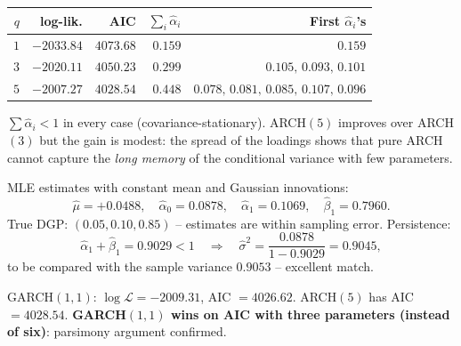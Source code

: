 \documentclass[a4paper,11pt]{article}
\begin{document}
\begin{solution}
\begin{center}
\begin{tabular}{rrrrr}
\toprule
$q$ & log-lik. & AIC      & $\sum_i \widehat\alpha_i$ & First $\widehat\alpha_i$'s \\
\midrule
$1$ & $-2033.84$ & $4073.68$ & $0.159$ & $0.159$ \\
$3$ & $-2020.11$ & $4050.23$ & $0.299$ & $0.105,\,0.093,\,0.101$ \\
$5$ & $-2007.27$ & $\bm{4028.54}$ & $0.448$ & $0.078,\,0.081,\,0.085,\,0.107,\,0.096$ \\
\bottomrule
\end{tabular}
\end{center}
$\sum \widehat\alpha_i < 1$ in every case (covariance-stationary).
ARCH$(5)$ improves over ARCH$(3)$ but the gain is modest: the
spread of the loadings shows that pure ARCH cannot capture the
\emph{long memory} of the conditional variance with few parameters.
\end{solution}

\begin{exercise}\end{exercise}

\begin{solution}
MLE estimates with constant mean and Gaussian innovations:
\[
  \widehat\mu = +0.0488,
  \quad
  \widehat\alpha_0 = 0.0878,
  \quad
  \widehat\alpha_1 = 0.1069,
  \quad
  \widehat\beta_1  = 0.7960.
\]
True DGP: $(0.05, 0.10, 0.85)$ -- estimates are within sampling
error. Persistence:
\[
  \widehat\alpha_1 + \widehat\beta_1 = 0.9029 < 1
  \quad\Rightarrow\quad
  \widehat\sigma^2 = \frac{0.0878}{1 - 0.9029}
                   = 0.9045,
\]
to be compared with the sample variance $0.9053$ -- excellent
match.

GARCH$(1, 1)$: $\log\mathcal L = -2009.31$, AIC $= 4026.62$.
ARCH$(5)$ has AIC $= 4028.54$. \textbf{GARCH$(1, 1)$ wins on AIC
with three parameters (instead of six)}: parsimony argument
confirmed.
\end{solution}

\begin{exercise}\end{exercise}
\end{document}
